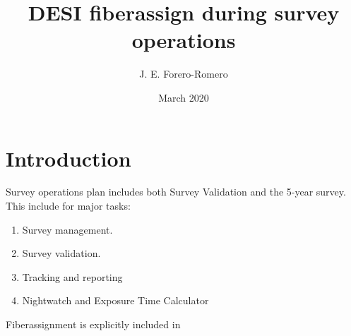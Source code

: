 \documentclass{article}
\title{DESI fiberassign during survey operations}
\author{J. E. Forero-Romero}
\date{March 2020}
\begin{document}
\maketitle

\section{Introduction}

Survey operations plan includes both Survey Validation and the 5-year survey.
This include for major tasks:
\begin{enumerate}
    \item Survey management.
    \item Survey validation.
    \item Tracking and reporting
    \item Nightwatch and Exposure Time Calculator
\end{enumerate}

Fiberassignment is explicitly included in 
\end{document}
